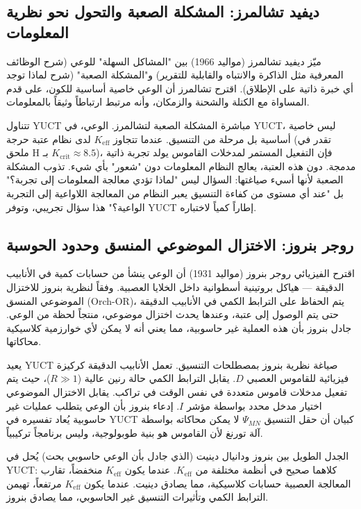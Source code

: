\documentclass[12pt,a4paper]{article}
\begin{document}
	\subsection{ديفيد تشالمرز: المشكلة الصعبة والتحول نحو نظرية المعلومات}
	
	ميّز ديفيد تشالمرز (مواليد 1966) بين "المشاكل السهلة" للوعي (شرح الوظائف المعرفية مثل الذاكرة والانتباه والقابلية للتقرير) و"المشكلة الصعبة" (شرح لماذا توجد أي خبرة ذاتية على الإطلاق). اقترح تشالمرز أن الوعي خاصية أساسية للكون، على قدم المساواة مع الكتلة والشحنة والزمكان، وأنه مرتبط ارتباطاً وثيقاً بالمعلومات.
	
	تتناول YUCT مباشرة المشكلة الصعبة لتشالمرز. الوعي، في YUCT، ليس خاصية أساسية بل مرحلة من التنسيق. عندما تتجاوز \(K_{\mathrm{eff}}\) لدى نظام عتبة حرجة (تقدر في ملحق H بـ \(K_{\mathrm{crit}} \approx 8.5\))، فإن التفعيل المستمر لمدخلات القاموس يولد تجربة ذاتية مدمجة. دون هذه العتبة، يعالج النظام المعلومات دون "شعور" بأي شيء. تذوب المشكلة الصعبة لأنها أسيء صياغتها: السؤال ليس "لماذا تؤدي معالجة المعلومات إلى تجربة؟" بل "عند أي مستوى من كفاءة التنسيق يعبر النظام من المعالجة اللاواعية إلى التجربة الواعية؟" هذا سؤال تجريبي، وتوفر YUCT إطاراً كمياً لاختباره.
	
	\subsection{روجر بنروز: الاختزال الموضوعي المنسق وحدود الحوسبة}
	
	اقترح الفيزيائي روجر بنروز (مواليد 1931) أن الوعي ينشأ من حسابات كمية في الأنابيب الدقيقة — هياكل بروتينية أسطوانية داخل الخلايا العصبية. وفقاً لنظرية بنروز للاختزال الموضوعي المنسق (Orch-OR)، يتم الحفاظ على الترابط الكمي في الأنابيب الدقيقة حتى يتم الوصول إلى عتبة، وعندها يحدث اختزال موضوعي، منتجاً لحظة من الوعي. جادل بنروز بأن هذه العملية غير حاسوبية، مما يعني أنه لا يمكن لأي خوارزمية كلاسيكية محاكاتها.
	
	يعيد YUCT صياغة نظرية بنروز بمصطلحات التنسيق. تعمل الأنابيب الدقيقة كركيزة فيزيائية للقاموس العصبي \(D\). يقابل الترابط الكمي حالة رنين عالية (\(R \gg 1\))، حيث يتم تفعيل مدخلات قاموس متعددة في نفس الوقت في تراكب. يقابل الاختزال الموضوعي اختيار مدخل محدد بواسطة مؤشر \(I\). إدعاء بنروز بأن الوعي يتطلب عمليات غير حاسوبية يُعاد تفسيره في YUCT كبيان أن حقل التنسيق \(\Psi_{MN}\) لا يمكن محاكاته بواسطة آلة تورنغ لأن القاموس هو بنية طوبولوجية، وليس برنامجاً تركيبياً.
	
	الجدل الطويل بين بنروز ودانيال دينيت (الذي جادل بأن الوعي حاسوبي بحت) يُحل في YUCT: كلاهما صحيح في أنظمة مختلفة من \(K_{\mathrm{eff}}\). عندما يكون \(K_{\mathrm{eff}}\) منخفضاً، تقارب المعالجة العصبية حسابات كلاسيكية، مما يصادق دينيت. عندما يكون \(K_{\mathrm{eff}}\) مرتفعاً، تهيمن الترابط الكمي وتأثيرات التنسيق غير الحاسوبي، مما يصادق بنروز.
	
\end{document}
